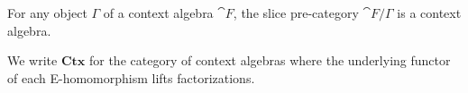 \begin{cor}
For any object $\Gamma$ of a context algebra $\cat{F}$, the slice pre-category $\cat{F}/\Gamma$
is a context algebra.
\end{cor}

\begin{defn}
We write $\mathbf{Ctx}$ for the category of context algebras where the underlying
functor of each E-homomorphism lifts factorizations.
\end{defn} 

\begin{comment}
\begin{rmk}[Needs more precision]
Consider the category $E$ generated by the graph consisting of the objects of 
the underlying category of an $E$-system $\mathcal{E}$ as edges, and the morphisms
$S_t:X\to Y$ and $W_A:Y\to X$ as edges, subject to the axioms of an $E$-systems.
 
Any morphism of $E$ can be rewritten in a unique way
as a composition $\tilde S\circ \tilde W$, where $\tilde S$ is a morphism in
substitution-normal form, $\tilde W$ is in weakening normal form, every term
expression is in normal form, and where
each occurence of $S_x\circ W_A$ and $S_{\tfid{A}}\circ W_A/A$ is eliminated.
\end{rmk}
\end{comment}

\begin{comment}
\section{An example with finite sets}

\begin{defn}
Let $\cat{C}$ be pre-category with chosen finite limits in
which the terminal object is also the initial object (e.g.~the category of
non-empty sets or groups), 
and write $\cat{C}'$ for the category with the
same objects as $\cat{C}$, and with the monomorphisms of $\cat{C}$ as morphisms. 
We define the E-system $\mathbf{E}_{\cat{C}}$ to have underlying category
$\cat{C}'$, where a term of a monomorphism $m$ is a section of $m$.

 
\end{defn}

\begin{defn}
We define the E-system $\mathbf{E_{fin}}$ of finite sets. A context of
$\mathbf{E_{fin}}$ is a finite set. A family $A$ over $\Gamma$
\end{defn}
\end{comment}

